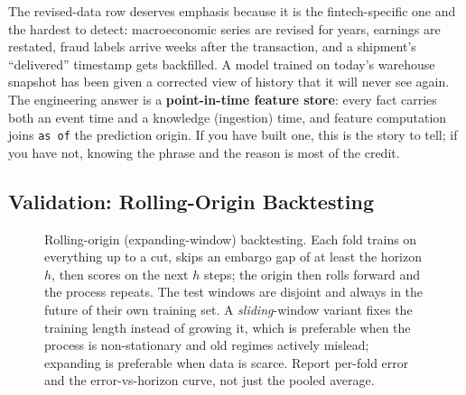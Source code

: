 The revised-data row deserves emphasis because it is the fintech-specific one and the hardest to detect: macroeconomic series are revised for years, earnings are restated, fraud labels arrive weeks after the transaction, and a shipment's ``delivered'' timestamp gets backfilled. A model trained on today's warehouse snapshot has been given a corrected view of history that it will never see again. The engineering answer is a \textbf{point-in-time feature store}: every fact carries both an event time and a knowledge (ingestion) time, and feature computation joins \texttt{as of} the prediction origin. If you have built one, this is the story to tell; if you have not, knowing the phrase and the reason is most of the credit.

\subsection{Validation: Rolling-Origin Backtesting}

\begin{figure}[htbp]
\centering
{}
\caption{Rolling-origin (expanding-window) backtesting. Each fold trains on everything up to a cut, skips an embargo gap of at least the horizon $h$, then scores on the next $h$ steps; the origin then rolls forward and the process repeats. The test windows are disjoint and always in the future of their own training set. A \emph{sliding}-window variant fixes the training length instead of growing it, which is preferable when the process is non-stationary and old regimes actively mislead; expanding is preferable when data is scarce. Report per-fold error and the error-vs-horizon curve, not just the pooled average.}
\label{cml:fig:ts_rolling_origin}
\end{figure}

